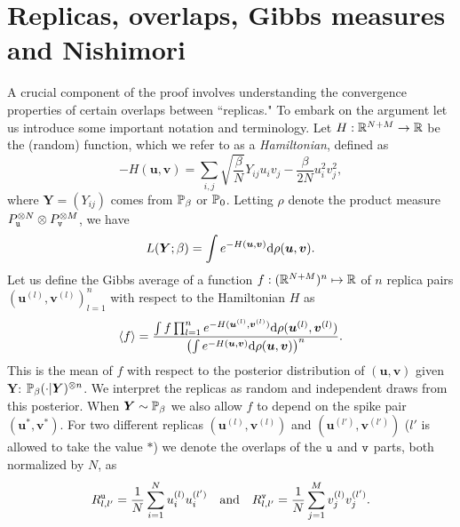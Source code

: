 \documentclass[final,12pt]{colt2018} %
\newcommand{\utt}{\textup{\texttt{u}}}
\newcommand{\vtt}{\textup{\texttt{v}}}
\renewcommand{\u}{\bm{u}}
\renewcommand{\v}{\bm{v}}
\newcommand{\Y}{\bm{Y}}
\begin{document}
\section{Replicas, overlaps, Gibbs measures and Nishimori}
A crucial component of the proof involves understanding the convergence properties of certain overlaps between ``replicas." To embark on the argument let us introduce some important notation and terminology. Let $H:\R^{N+M}\to \R$ be the (random) function, which we refer to as a \emph{Hamiltonian}, defined as
\begin{equation} \label{hamiltonian_general}
-H(\u,\v) = \sum_{i,j}\sqrt{\frac{\beta}{N}}Y_{ij}u_iv_j - \frac{\beta}{2N} u_i^2v_j^2,
\end{equation}
where $\Y = (Y_{ij})$ comes from $\P_{\beta}$ or $\P_{0}$. Letting $\rho$ denote the product measure $P_{\utt}^{\otimes N} \otimes P_{\vtt}^{\otimes M}$, we have 
\[L(\Y;\beta) = \int e^{-H(\u,\v)} \rmd \rho(\u,\v).\] 
Let us define the Gibbs average of a function $f: (\R^{N+M})^n\mapsto \R$ of $n$ {replica} pairs $(\u^{(l)},\v^{(l)})_{l=1}^n$ with respect to the Hamiltonian $H$ as
\begin{equation}\label{gibbs_average}
\left \langle f\right\rangle = \frac{\int f \prod_{l=1}^n e^{-H(\u^{(l)},\v^{(l)})}\rmd \rho(\u^{(l)},\v^{(l)})}{\left(\int e^{-H(\u,\v)}\rmd \rho(\u,\v)\right)^n}.
\end{equation} 
This is the mean of $f$ with respect to the posterior distribution of $(\u,\v)$ given $\Y$: $\P_{\beta}(\cdot|\Y)^{\otimes n}$. We interpret the replicas as random and independent draws from this posterior.    
When $\Y \sim \P_{\beta}$ we also allow $f$ to depend on the spike pair $(\u^*,\v^*)$. For two different replicas $(\u^{(l)},\v^{(l)})$ and $(\u^{(l')},\v^{(l')})$ ($l'$ is allowed to take the value $*$) we denote the overlaps of the $\utt$ and $\vtt$ parts, both normalized by $N$, as
\[R^{\utt}_{l,l'} = \frac{1}{N}\sum_{i=1}^N u_i^{(l)} u_i^{(l')} ~~~\mbox{and}~~~ R^{\vtt}_{l,l'} = \frac{1}{N}\sum_{j=1}^M v_j^{(l)} v_j^{(l')}.\]
\end{document}
